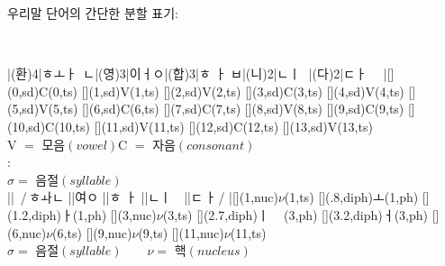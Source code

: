 \documentclass{article} %
\begin{document}
\begin{CJK}{UTF8}{mj}
\noindent
\begin{centering}
\begin{em} 우리말 단어의 간단한 분할 표기:\end{em}\\[1em]

\tiershortcuts %

\asr[reptype=nots,sd=(ph) -.5em (sound)]
|\qsyl({환})4|{ㅎ}{ㅗ}{ㅏ\ }{ㄴ}|\qsyl({영})3|{이}{ㅓ}{ㅇ}|\qsyl({합})3|{ㅎ}{ ㅏ }{ㅂ}|\qsyl({니})2|{ㄴ}{ㅣ\ \,}|\qsyl({다})2|{ㄷ}{ㅏ\ \ }
|\@[\sdoff](0,sd){C}\-(0,ts)
\@[\sdoff](1,sd){V}\-(1,ts)
\@[\sdoff](2,sd){V}\-(2,ts)
\@[\sdoff](3,sd){C}\-(3,ts)
\@[\sdoff](4,sd){V}\-(4,ts)
\@[\sdoff](5,sd){V}\-(5,ts)
\@[\sdoff](6,sd){C}\-(6,ts)
\@[\sdoff](7,sd){C}\-(7,ts)
\@[\sdoff](8,sd){V}\-(8,ts)
\@[\sdoff](9,sd){C}\-(9,ts)
\@[\sdoff](10,sd){C}\-(10,ts)
\@[\sdoff](11,sd){V}\-(11,ts)
\@[\sdoff](12,sd){C}\-(12,ts)
\@[\sdoff](13,sd){V}\-(13,ts)
\endasr\\[1em]

\small
V $=$ 모음$(vowel)$\qquad C $=$ 자음$(consonant)$\\[2em]

\normalsize
\asr[tssym=\small{$\bullet$}]:
\endasr\\[1em] %
\small
$\sigma=$ 음절$(syllable)$\\[2em]

\normalsize
\tiershortcuts
\asr[style=bigsyls,nuc=(sy) 1em ($\nu$),diph=(ph) -2em (monoph)]
||{\ /\,ㅎ}{ㅘ}{ㄴ}
||{여}{ㅇ}
||{ㅎ}{ ㅏ }{} %
||{ㄴ}{ㅣ\ \,}
||{ㄷ}{\,ㅏ\,/}
|\@[\nucoff](1,nuc){$\nu$}\-(1,ts)
\@[\diphoffA](.8,diph){ㅗ}\-(1,ph)
\@[\diphoffB](1.2,diph){ㅏ}\-(1,ph)
\@[\nucoff](3,nuc){$\nu$}\-(3,ts)
\@[\diphoffB](2.7,diph){ㅣ\ \ \,}\-(3,ph)
\@[\diphoffB](3.2,diph){ㅓ}\-(3,ph)
\@[\nucoff](6,nuc){$\nu$}\-(6,ts)
\@[\nucoff](9,nuc){$\nu$}\-(9,ts)
\@[\nucoff](11,nuc){$\nu$}\-(11,ts)
\endasr\\[.7em]

\small
$\sigma=$ 음절$(syllable)\qquad\nu=$ 핵$(nucleus)$
\end{centering}
\end{CJK}
\end{document}
